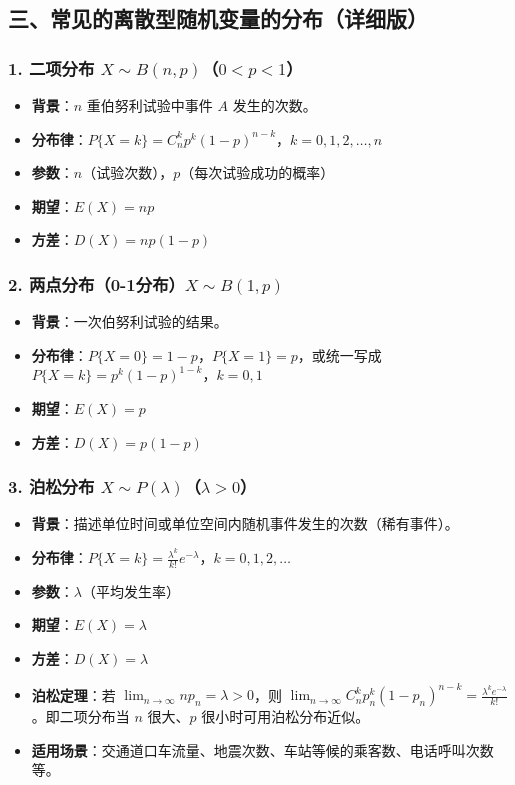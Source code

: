 \documentclass[12pt,a4paper]{ctexart}
\begin{document}
\subsection{三、常见的离散型随机变量的分布（详细版）}

\subsubsection{1. 二项分布 $X \sim B(n, p)$（$0 < p < 1$）}
\begin{itemize}[noitemsep]
    \item \textbf{背景}：$n$ 重伯努利试验中事件 $A$ 发生的次数。
    \item \textbf{分布律}：$P\{X = k\} = C_n^k p^k (1-p)^{n-k}$，$k = 0,1,2,\dots,n$
    \item \textbf{参数}：$n$（试验次数），$p$（每次试验成功的概率）
    \item \textbf{期望}：$E(X) = np$
    \item \textbf{方差}：$D(X) = np(1-p)$
\end{itemize}

\subsubsection{2. 两点分布（0-1分布）$X \sim B(1, p)$}
\begin{itemize}[noitemsep]
    \item \textbf{背景}：一次伯努利试验的结果。
    \item \textbf{分布律}：$P\{X = 0\} = 1-p$，$P\{X = 1\} = p$，或统一写成 $P\{X = k\} = p^k (1-p)^{1-k}$，$k = 0,1$
    \item \textbf{期望}：$E(X) = p$
    \item \textbf{方差}：$D(X) = p(1-p)$
\end{itemize}

\subsubsection{3. 泊松分布 $X \sim P(\lambda)$（$\lambda > 0$）}
\begin{itemize}[noitemsep]
    \item \textbf{背景}：描述单位时间或单位空间内随机事件发生的次数（稀有事件）。
    \item \textbf{分布律}：$P\{X = k\} = \frac{\lambda^k}{k!} e^{-\lambda}$，$k = 0,1,2,\dots$
    \item \textbf{参数}：$\lambda$（平均发生率）
    \item \textbf{期望}：$E(X) = \lambda$
    \item \textbf{方差}：$D(X) = \lambda$
    \item \textbf{泊松定理}：若 $\lim_{n \to \infty} np_n = \lambda > 0$，则 $\lim_{n \to \infty} C_n^k p_n^k (1-p_n)^{n-k} = \frac{\lambda^k e^{-\lambda}}{k!}$。即二项分布当 $n$ 很大、$p$ 很小时可用泊松分布近似。
    \item \textbf{适用场景}：交通道口车流量、地震次数、车站等候的乘客数、电话呼叫次数等。
\end{itemize}
\end{document}
